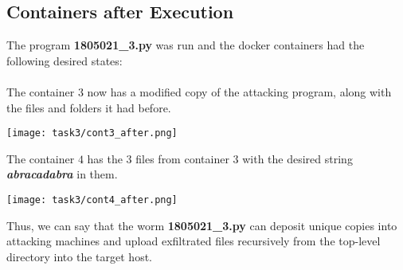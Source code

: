 \documentclass{article}
\begin{document}
\subsection{Containers after Execution}
The program \textbf{1805021\_3.py} was run and the docker containers had the following desired states:\\\\

The container $3$ now has a modified copy of the attacking program, along with the files and folders it had before. 
\begin{center}
    \texttt{[image: task3/cont3\_after.png]}
\end{center}

The container $4$ has the $3$ files from container $3$ with the desired string \textbf{\textit{abracadabra}} in them. 
\begin{center}
    \texttt{[image: task3/cont4\_after.png]}
\end{center}

Thus, we can say that the worm \textbf{1805021\_3.py} can deposit unique copies into attacking machines and upload exfiltrated files recursively from the top-level directory into the target host.
\end{document}
